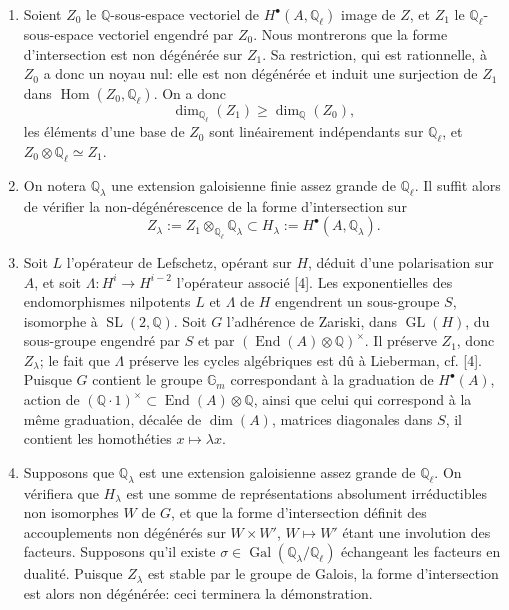 \documentclass[11pt]{article}
\newcommand{\Q}{\mathbb Q}
\newcommand{\Gm}{\mathbb G_m}
\newcommand{\Gal}{\operatorname{Gal}}
\newcommand{\End}{\operatorname{End}}
\newcommand{\Hom}{\operatorname{Hom}}
\newcommand{\GL}{\operatorname{GL}}
\newcommand{\SL}{\operatorname{SL}}
\theoremstyle{deligne}
\begin{document}
\begin{enumerate}[label=(\alph*)]
\item Soient $Z_0$ le $\Q$-sous-espace vectoriel de $H^\bullet(A,\Q_\ell)$ image de $Z$, et $Z_1$ le $\Q_\ell$-sous-espace vectoriel engendré par $Z_0$. Nous montrerons que la forme d'intersection est non dégénérée sur $Z_1$. Sa restriction, qui est rationnelle, à $Z_0$ a donc un noyau nul: elle est non dégénérée et induit une surjection de $Z_1$ dans $\Hom(Z_0,\Q_\ell)$. On a donc
\[
\dim_{\Q_\ell}(Z_1)\ge \dim_{\Q}(Z_0),
\]
les éléments d'une base de $Z_0$ sont linéairement indépendants sur $\Q_\ell$, et $Z_0\otimes\Q_\ell\simeq Z_1$.
\item On notera $\Q_\lambda$ une extension galoisienne finie assez grande de $\Q_\ell$. Il suffit alors de vérifier la non-dégénérescence de la forme d'intersection sur
\[
Z_\lambda:=Z_1\otimes_{\Q_\ell}\Q_\lambda\subset H_\lambda:=H^\bullet(A,\Q_\lambda).
\]
\item Soit $L$ l'opérateur de Lefschetz, opérant sur $H$, déduit d'une polarisation sur $A$, et soit $\Lambda:H^i\to H^{i-2}$ l'opérateur associé [4]. Les exponentielles des endomorphismes nilpotents $L$ et $\Lambda$ de $H$ engendrent un sous-groupe $S$, isomorphe à $\SL(2,\Q)$. Soit $G$ l'adhérence de Zariski, dans $\GL(H)$, du sous-groupe engendré par $S$ et par $(\End(A)\otimes\Q)^\times$. Il préserve $Z_1$, donc $Z_\lambda$; le fait que $\Lambda$ préserve les cycles algébriques est dû à Lieberman, cf. [4]. Puisque $G$ contient le groupe $\Gm$ correspondant à la graduation de $H^\bullet(A)$, action de $(\Q\cdot1)^\times\subset\End(A)\otimes\Q$, ainsi que celui qui correspond à la même graduation, décalée de $\dim(A)$, matrices diagonales dans $S$, il contient les homothéties $x\mapsto \lambda x$.
\item Supposons que $\Q_\lambda$ est une extension galoisienne assez grande de $\Q_\ell$. On vérifiera que $H_\lambda$ est une somme de représentations absolument irréductibles non isomorphes $W$ de $G$, et que la forme d'intersection définit des accouplements non dégénérés sur $W\times W'$, $W\mapsto W'$ étant une involution des facteurs. Supposons qu'il existe $\sigma\in\Gal(\Q_\lambda/\Q_\ell)$ échangeant les facteurs en dualité. Puisque $Z_\lambda$ est stable par le groupe de Galois, la forme d'intersection est alors non dégénérée: ceci terminera la démonstration.
\end{enumerate}
\end{document}
